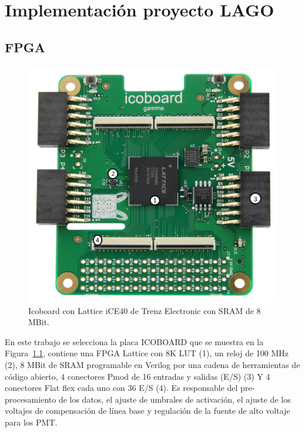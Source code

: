 \chapter{Implementación proyecto LAGO}
\section{FPGA}

\begin{figure}[h]
\includegraphics[scale=0.18]{Figs/icoboard.jpg} 
\centering
\caption{Icoboard con Lattice iCE40 de Trenz Electronic con SRAM de 8 MBit.~\citep{IcoBoard}}
\label{icoboard}
\end{figure}

En este trabajo se selecciona la placa ICOBOARD que se muestra en la Figura~\ref{icoboard},  contiene una FPGA Lattice con 8K LUT (1), un reloj de 100 MHz (2), 8 MBit de SRAM programable en Verilog por una cadena de herramientas de código abierto, 4 conectores Pmod de 16 entradas y salidas (E/S) (3) Y 4 conectores Flat flex cada uno con 36 E/S (4). Es responsable del pre-procesamiento de los datos, el ajuste de umbrales de activación, el ajuste de los voltajes de compensación de línea base y regulación de la fuente de alto voltaje para los PMT.



